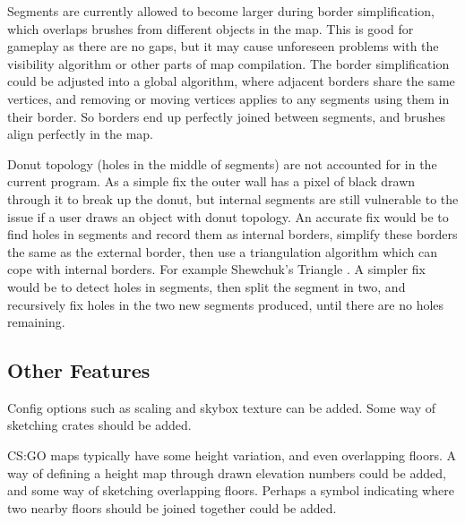 \documentclass[11pt]{IEEEtran}
\begin{document}
Segments are currently allowed to become larger during border simplification, which overlaps brushes from different objects in the map. This is good for gameplay as there are no gaps, but it may cause unforeseen problems with the visibility algorithm or other parts of map compilation. The border simplification could be adjusted into a global algorithm, where adjacent borders share the same vertices, and removing or moving vertices applies to any segments using them in their border. So borders end up perfectly joined between segments, and brushes align perfectly in the map.

Donut topology (holes in the middle of segments) are not accounted for in the current program. As a simple fix the outer wall has a pixel of black drawn through it to break up the donut, but internal segments are still vulnerable to the issue if a user draws an object with donut topology. An accurate fix would be to find holes in segments and record them as internal borders, simplify these borders the same as the external border, then use a triangulation algorithm which can cope with internal borders. For example Shewchuk's Triangle \cite{shewchuk2005two}. A simpler fix would be to detect holes in segments, then split the segment in two, and recursively fix holes in the two new segments produced, until there are no holes remaining.

\subsection{Other Features}

Config options such as scaling and skybox texture can be added. Some way of sketching crates should be added.

CS:GO maps typically have some height variation, and even overlapping floors. A way of defining a height map through drawn elevation numbers could be added, and some way of sketching overlapping floors. Perhaps a symbol indicating where two nearby floors should be joined together could be added.



\end{document}
